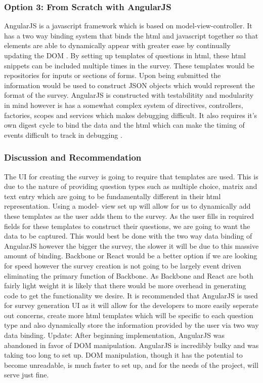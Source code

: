 \documentclass[letterpaper,10pt,serif, draftclsnofoot,onecolumn, compsoc, titlepage]{IEEEtran}
\begin{document}
\subsubsection{Option 3: From Scratch with AngularJS}
AngularJS is a javascript framework which is based on model-view-controller. It has a two way binding system that binds the html
 and javascript together so that  elements are able to dynamically appear with greater ease by continually updating the DOM \cite{angular}. By setting up templates of questions in html, these html snippets can be included multiple times in the survey. These templates would be repositories for inputs or sections of forms. Upon being submitted the information would be used to construct JSON objects which would represent the format of the survey. AngularJS is constructed with testabilitity and modularity in mind however is has a somewhat complex system of directives, controllers, factories, scopes and services which makes debugging difficult. It also requires it's own digest cycle to bind the data and the html which can make the timing of events difficult to track in debugging \cite{angVreact}. 
\subsubsection{Discussion and Recommendation}
The UI for creating the survey is going to require that templates are used. This is due to the nature of providing question types such
as multiple choice, matrix and text entry which are going to be fundamentally different in their html representation. Using a model-
view set up will allow for us to dynamically add these templates as the user adds them to the survey. As the user fills in required fields for these templates to construct their questions, we are going to want the data to be captured. This would best be done with 
the two way data binding of AngularJS however the bigger the survey, the slower it will be due to this massive amount of binding. 
Backbone or React would be a better option if we are looking for speed however the survey creation is not going to be largely 
event driven eliminating the primary function of Backbone. As Backbone and React are both fairly light weight it is likely that there
would be more overhead in generating code to get the functionality we desire. It is recommended that AngularJS is used for survey generation UI as it will allow for the developers to more easily seperate out concerns, create more html templates which will be
specific to each question type and also dynamically store the information provided by the user via two way data binding.
Update: After beginning implementation, AngularJS was abandoned in favor of DOM manipulation. AngularJS is incredibly bulky and was taking too long to set up. DOM manipulation, though it has the potential to become unreadable, is much faster to set up, and for the needs of the project, will serve just fine.  
\end{document}

